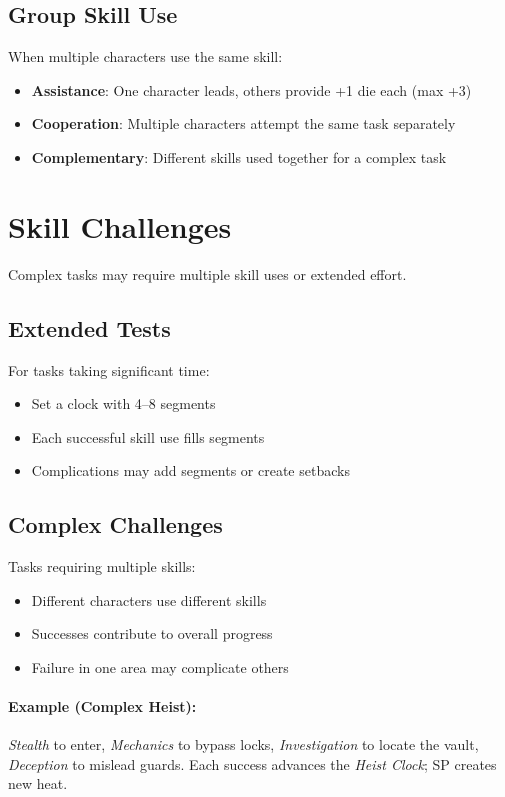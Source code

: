 \begin{multicols}{2}
\subsection*{Group Skill Use}
When multiple characters use the same skill:
\begin{itemize}
\item \textbf{Assistance}: One character leads, others provide +1 die each (max +3)
\item \textbf{Cooperation}: Multiple characters attempt the same task separately
\item \textbf{Complementary}: Different skills used together for a complex task
\end{itemize}

\section{Skill Challenges}

Complex tasks may require multiple skill uses or extended effort.

\subsection*{Extended Tests}
For tasks taking significant time:
\begin{itemize}
\item Set a clock with 4--8 segments
\item Each successful skill use fills segments
\item Complications may add segments or create setbacks
\end{itemize}

\subsection*{Complex Challenges}
Tasks requiring multiple skills:
\begin{itemize}
\item Different characters use different skills
\item Successes contribute to overall progress
\item Failure in one area may complicate others
\end{itemize}

\paragraph{Example (Complex Heist):}
\emph{Stealth} to enter, \emph{Mechanics} to bypass locks, \emph{Investigation} to locate the vault, \emph{Deception} to mislead guards. Each success advances the \emph{Heist Clock}; SP creates new heat.


\end{multicols}
